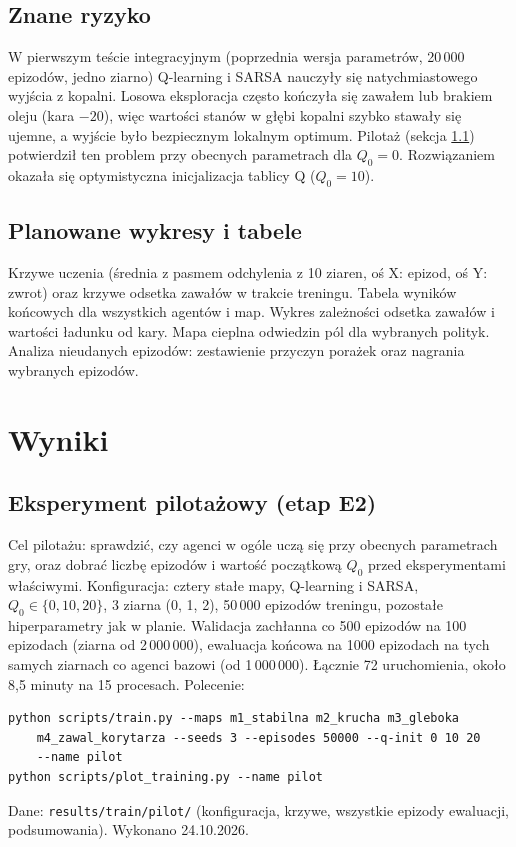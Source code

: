\documentclass[11pt,a4paper]{article}
\begin{document}
\subsection{Znane ryzyko}
W pierwszym teście integracyjnym (poprzednia wersja parametrów, 20\,000 epizodów,
jedno ziarno) Q-learning i SARSA nauczyły się natychmiastowego wyjścia z kopalni.
Losowa eksploracja często kończyła się zawałem lub brakiem oleju (kara $-20$),
więc wartości stanów w głębi kopalni szybko stawały się ujemne, a wyjście było
bezpiecznym lokalnym optimum. Pilotaż (sekcja \ref{sec:pilot}) potwierdził ten
problem przy obecnych parametrach dla $Q_0=0$. Rozwiązaniem okazała się
optymistyczna inicjalizacja tablicy Q ($Q_0=10$).

\subsection{Planowane wykresy i tabele}
Krzywe uczenia (średnia z pasmem odchylenia z 10 ziaren, oś X: epizod, oś Y:
zwrot) oraz krzywe odsetka zawałów w trakcie treningu. Tabela wyników końcowych
dla wszystkich agentów i map. Wykres zależności odsetka zawałów i wartości
ładunku od kary. Mapa cieplna odwiedzin pól dla wybranych polityk. Analiza
nieudanych epizodów: zestawienie przyczyn porażek oraz nagrania wybranych
epizodów.

\section{Wyniki}
\subsection{Eksperyment pilotażowy (etap E2)}\label{sec:pilot}
Cel pilotażu: sprawdzić, czy agenci w ogóle uczą się przy obecnych parametrach
gry, oraz dobrać liczbę epizodów i wartość początkową $Q_0$ przed eksperymentami
właściwymi. Konfiguracja: cztery stałe mapy, Q-learning i SARSA,
$Q_0\in\{0, 10, 20\}$, 3 ziarna (0, 1, 2), 50\,000 epizodów treningu,
pozostałe hiperparametry jak w planie. Walidacja zachłanna co 500 epizodów na 100
epizodach (ziarna od 2\,000\,000), ewaluacja końcowa na 1000 epizodach na tych
samych ziarnach co agenci bazowi (od 1\,000\,000). Łącznie 72 uruchomienia,
około 8,5 minuty na 15 procesach. Polecenie:
\begin{verbatim}
python scripts/train.py --maps m1_stabilna m2_krucha m3_gleboka
    m4_zawal_korytarza --seeds 3 --episodes 50000 --q-init 0 10 20
    --name pilot
python scripts/plot_training.py --name pilot
\end{verbatim}
Dane: \texttt{results/train/pilot/} (konfiguracja, krzywe, wszystkie epizody
ewaluacji, podsumowania). Wykonano 24.10.2026.
\end{document}
